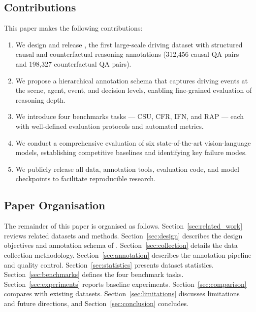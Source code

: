 \subsection*{Contributions}

This paper makes the following contributions:

\begin{enumerate}[leftmargin=2em, noitemsep, label=\textbf{C\arabic*.}]
  \item We design and release \lucid{}, the first large-scale driving dataset
        with structured causal and counterfactual reasoning annotations
        (312,456 causal QA pairs and 198,327 counterfactual QA pairs).
  \item We propose a hierarchical annotation schema that captures driving events at
        the scene, agent, event, and decision levels, enabling fine-grained evaluation
        of reasoning depth.
  \item We introduce four benchmarks tasks --- CSU, CFR, IFN, and RAP --- each with
        well-defined evaluation protocols and automated metrics.
  \item We conduct a comprehensive evaluation of six state-of-the-art vision-language
        models, establishing competitive baselines and identifying key failure modes.
  \item We publicly release all data, annotation tools, evaluation code, and model
        checkpoints to facilitate reproducible research.
\end{enumerate}

\subsection*{Paper Organisation}

The remainder of this paper is organised as follows. Section~\ref{sec:related_work}
reviews related datasets and methods. Section~\ref{sec:design} describes the design
objectives and annotation schema of \lucid{}. Section~\ref{sec:collection} details
the data collection methodology. Section~\ref{sec:annotation} describes the
annotation pipeline and quality control. Section~\ref{sec:statistics} presents
dataset statistics. Section~\ref{sec:benchmarks} defines the four benchmark tasks.
Section~\ref{sec:experiments} reports baseline experiments. Section~\ref{sec:comparison}
compares \lucid{} with existing datasets. Section~\ref{sec:limitations} discusses
limitations and future directions, and Section~\ref{sec:conclusion} concludes.
